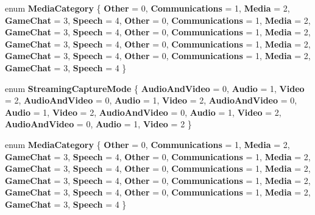 \begin{DoxyCompactItemize}
enum {\bfseries Media\+Category} \{ \newline
{\bfseries Other} = 0, 
{\bfseries Communications} = 1, 
{\bfseries Media} = 2, 
{\bfseries Game\+Chat} = 3, 
\newline
{\bfseries Speech} = 4, 
{\bfseries Other} = 0, 
{\bfseries Communications} = 1, 
{\bfseries Media} = 2, 
\newline
{\bfseries Game\+Chat} = 3, 
{\bfseries Speech} = 4, 
{\bfseries Other} = 0, 
{\bfseries Communications} = 1, 
\newline
{\bfseries Media} = 2, 
{\bfseries Game\+Chat} = 3, 
{\bfseries Speech} = 4, 
{\bfseries Other} = 0, 
\newline
{\bfseries Communications} = 1, 
{\bfseries Media} = 2, 
{\bfseries Game\+Chat} = 3, 
{\bfseries Speech} = 4, 
\newline
{\bfseries Other} = 0, 
{\bfseries Communications} = 1, 
{\bfseries Media} = 2, 
{\bfseries Game\+Chat} = 3, 
\newline
{\bfseries Speech} = 4
 \}
\item 
\mbox{\label{namespace_windows_1_1_media_1_1_capture_a69a6672cfbdb543586234a95b0049c04}} 
enum {\bfseries Streaming\+Capture\+Mode} \{ \newline
{\bfseries Audio\+And\+Video} = 0, 
{\bfseries Audio} = 1, 
{\bfseries Video} = 2, 
{\bfseries Audio\+And\+Video} = 0, 
\newline
{\bfseries Audio} = 1, 
{\bfseries Video} = 2, 
{\bfseries Audio\+And\+Video} = 0, 
{\bfseries Audio} = 1, 
\newline
{\bfseries Video} = 2, 
{\bfseries Audio\+And\+Video} = 0, 
{\bfseries Audio} = 1, 
{\bfseries Video} = 2, 
\newline
{\bfseries Audio\+And\+Video} = 0, 
{\bfseries Audio} = 1, 
{\bfseries Video} = 2
 \}
\item 
\mbox{\label{namespace_windows_1_1_media_1_1_capture_a2061b374080798df6bea2b4f65634663}} 
enum {\bfseries Media\+Category} \{ \newline
{\bfseries Other} = 0, 
{\bfseries Communications} = 1, 
{\bfseries Media} = 2, 
{\bfseries Game\+Chat} = 3, 
\newline
{\bfseries Speech} = 4, 
{\bfseries Other} = 0, 
{\bfseries Communications} = 1, 
{\bfseries Media} = 2, 
\newline
{\bfseries Game\+Chat} = 3, 
{\bfseries Speech} = 4, 
{\bfseries Other} = 0, 
{\bfseries Communications} = 1, 
\newline
{\bfseries Media} = 2, 
{\bfseries Game\+Chat} = 3, 
{\bfseries Speech} = 4, 
{\bfseries Other} = 0, 
\newline
{\bfseries Communications} = 1, 
{\bfseries Media} = 2, 
{\bfseries Game\+Chat} = 3, 
{\bfseries Speech} = 4, 
\newline
{\bfseries Other} = 0, 
{\bfseries Communications} = 1, 
{\bfseries Media} = 2, 
{\bfseries Game\+Chat} = 3, 
\newline
{\bfseries Speech} = 4
 \}
\end{DoxyCompactItemize}

